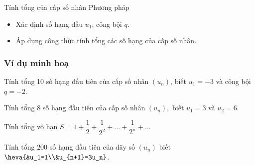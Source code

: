\begin{dang}{Tính tổng của cấp số nhân}
	Phương pháp
	\begin{itemize}
		\item Xác định số hạng đầu $u_1$, công bội $q$.
		\item Áp dụng công thức tính tổng các số hạng của cấp số nhân. 
	\end{itemize}
\end{dang}
\subsubsection{Ví dụ minh hoạ}
\begin{vd}%
	Tính tổng 10 số hạng đầu tiên của cấp số nhân $(u_n)$, biết $u_1=-3$ và công bội $q=-2$. 
\end{vd}

\begin{vd}%
	Tính tổng $8$ số hạng đầu tiên của cấp số nhân $(u_n),$ biết $u_1=3$ và $u_2=6$. 
\end{vd}

\begin{vd}%
	Tính tổng vô hạn $S=1+\dfrac{1}{2}+\dfrac{1}{2^2}+...+\dfrac{1}{2^n}+...$ 
\end{vd}

\begin{vd}%
	Tính tổng $200$ số hạng đầu tiên của dãy số $(u_n)$ biết $\heva{&u_1=1\\&u_{n+1}=3u_n}$.
\end{vd}


